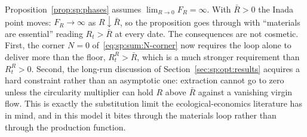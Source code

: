 \begin{remark}\label{rem:qsp:Rbar}
Proposition~\ref{prop:sp:phases} assumes $\lim_{R\to0}F_R=\infty$. With $\bar R>0$ the Inada point
moves: $F_R\to\infty$ as $R\downarrow\bar R$, so the proposition goes through with ``materials are
essential'' reading $R_t>\bar R$ at every date. The consequences are not cosmetic. First, the corner
$N=0$ of~\eqref{eq:sp:sum:N-corner} now requires the loop alone to deliver more than the floor,
$R^R_t>\bar R$, which is a much stronger requirement than $R^R_t>0$. Second, the long-run discussion of
Section~\ref{sec:sp:opt:results} acquires a hard constraint rather than an asymptotic one: extraction
cannot go to zero unless the circularity multiplier can hold $R$ above $\bar R$ against a vanishing
virgin flow. This is exactly the substitution limit the ecological-economics literature has in mind,
and in this model it bites through the materials loop rather than through the production function.
\end{remark}

